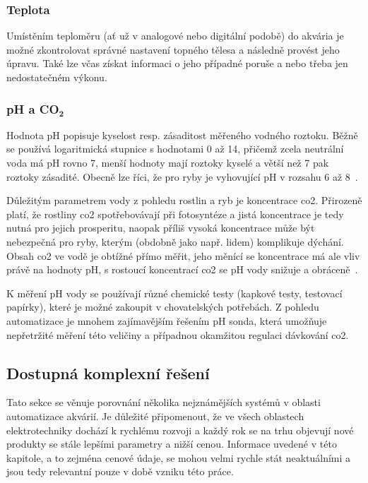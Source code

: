         \subsubsection{Teplota}
            Umístěním teploměru (ať už v analogové nebo digitální podobě) do akvária je možné zkontrolovat správné nastavení topného tělesa a následně provést jeho úpravu. Také lze včas získat informaci o jeho případné poruše a nebo třeba jen nedostatečném výkonu. 
        \subsubsection{pH a CO\(\mathbf{_{2}}\)}
            Hodnota pH popisuje kyselost resp. zásaditost měřeného vodného roztoku. Běžně se používá logaritmická stupnice s hodnotami 0 až 14, přičemž zcela neutrální voda má pH rovno 7, menší hodnoty mají roztoky kyselé a větší než 7 pak roztoky zásadité.  Obecně lze říci, že pro ryby je vyhovující pH v rozsahu 6 až 8~\cite{slavotinek2014}. 

            Důležitým parametrem vody z pohledu rostlin a ryb je koncentrace \acs{co2}. Přirozeně platí, že rostliny \acs{co2} spotřebovávají při fotosyntéze a jistá koncentrace je tedy nutná pro jejich prosperitu, naopak příliš vysoká koncentrace může být nebezpečná pro ryby, kterým (obdobně jako např. lidem) komplikuje dýchání. Obsah \acs{co2} ve vodě je obtížné přímo měřit, jeho měnící se koncentrace má ale vliv právě na hodnoty pH, s rostoucí koncentrací \acs{co2} se pH vody snižuje a obráceně~\cite{DvorakJan2014RPpa,KejzlarRadim2022Ařpa}. 

            K měření pH vody se používají různé chemické testy (kapkové testy, testovací papírky), které je možné zakoupit v chovatelských potřebách. Z pohledu automatizace je mnohem zajímavějším řešením pH sonda, která umožňuje nepřetržité měření této veličiny a případnou okamžitou regulaci dávkování \acs{co2}.

             
    \subsection{Dostupná komplexní řešení}
    \label{lab:kapitola-komplexni-reseni}
        Tato sekce se věnuje porovnání několika nejznámějších systémů v oblasti automatizace akvárií. Je důležité připomenout, že ve všech oblastech elektrotechniky dochází k rychlému rozvoji a každý rok se na trhu objevují nové produkty se stále lepšími parametry a nižší cenou. Informace uvedené v této kapitole, a to zejména cenové údaje, se mohou velmi rychle stát neaktuálními a jsou tedy relevantní pouze v době vzniku této práce.

